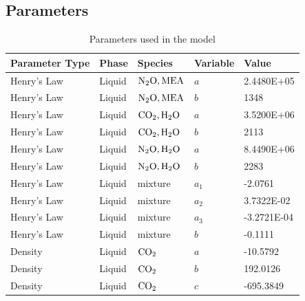 \documentclass[a4paper,fleqn]{cas-sc}
\begin{document}
    \newpage
    \subsection{Parameters}

    \begin{longtable}{lllll}
        \caption{Parameters used in the model} \\
        \hline
        \textbf{Parameter Type} & \textbf{Phase} & \textbf{Species}    & \textbf{Variable} & \textbf{Value} \\ \hline
        \endhead
%
        Henry's Law               & Liquid         & $\ce{N2O},\ce{MEA}$ & $a$               & 2.4480E+05     \\
        Henry's Law               & Liquid         & $\ce{N2O},\ce{MEA}$ & $b$               & 1348           \\
        Henry's Law               & Liquid         & $\ce{CO2},\ce{H2O}$ & $a$               & 3.5200E+06     \\
        Henry's Law               & Liquid         & $\ce{CO2},\ce{H2O}$ & $b$               & 2113           \\
        Henry's Law               & Liquid         & $\ce{N2O},\ce{H2O}$ & $a$               & 8.4490E+06     \\
        Henry's Law               & Liquid         & $\ce{N2O},\ce{H2O}$ & $b$               & 2283           \\
        Henry's Law               & Liquid         & mixture             & $a_1$             & -2.0761        \\
        Henry's Law               & Liquid         & mixture             & $a_2$             & 3.7322E-02     \\
        Henry's Law               & Liquid         & mixture             & $a_3$             & -3.2721E-04    \\
        Henry's Law               & Liquid         & mixture             & $b$               & -0.1111        \\
        Density                   & Liquid         & $\ce{CO2}$          & $a$               & -10.5792       \\
        Density                   & Liquid         & $\ce{CO2}$          & $b$               & 192.0126       \\
        Density                   & Liquid         & $\ce{CO2}$          & $c$               & -695.3849      \\

\end{longtable}
\end{document}

